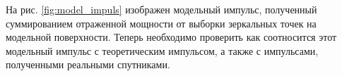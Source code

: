  На рис. \ref{fig:model_impuls} изображен модельный импульс, полученный
 суммированием отраженной мощности от выборки зеркальных точек на модельной
 поверхности. Теперь необходимо проверить как соотносится этот модельный
 импульс с теоретическим импульсом, а также с импульсами, полученными реальными
 спутниками. 










%
